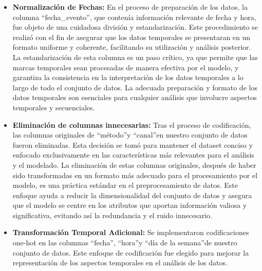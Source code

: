 \begin{itemize}
    \item \textbf{Normalización de Fechas:} En el proceso de preparación de los datos, la columna \textquotedblleft fecha\_evento\textquotedblright, que contenía información relevante de fecha y hora, fue objeto de una cuidadosa división y estandarización. Este procedimiento se realizó con el fin de asegurar que los datos temporales se presentaran en un formato uniforme y coherente, facilitando su utilización y análisis posterior. La estandarización de esta columna es un paso crítico, ya que permite que las marcas temporales sean procesadas de manera efectiva por el modelo, y garantiza la consistencia en la interpretación de los datos temporales a lo largo de todo el conjunto de datos. La adecuada preparación y formato de los datos temporales son esenciales para cualquier análisis que involucre aspectos temporales y secuenciales.
    \item \textbf{Eliminación de columnas innecesarias:} Tras el proceso de codificación, las columnas originales de \textquotedblleft método\textquotedblright y \textquotedblleft canal\textquotedblright en nuestro conjunto de datos fueron eliminadas. Esta decisión se tomó para mantener el dataset conciso y enfocado exclusivamente en las características más relevantes para el análisis y el modelado. La eliminación de estas columnas originales, después de haber sido transformadas en un formato más adecuado para el procesamiento por el modelo, es una práctica estándar en el preprocesamiento de datos. Este enfoque ayuda a reducir la dimensionalidad del conjunto de datos y asegura que el modelo se centre en los atributos que aportan información valiosa y significativa, evitando así la redundancia y el ruido innecesario.
    \item \textbf{Transformación Temporal Adicional:} Se implementaron codificaciones one-hot en las columnas \textquotedblleft fecha\textquotedblright, \textquotedblleft hora\textquotedblright y \textquotedblleft día de la semana\textquotedblright de nuestro conjunto de datos. Este enfoque de codificación fue elegido para mejorar la representación de los aspectos temporales en el análisis de los datos.
\end{itemize}

